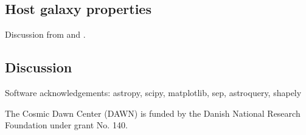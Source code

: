 \documentclass[twocolumn]{aastex63}
\begin{document}
\subsection{Host galaxy properties}
\label{ss:host}

Discussion from \cite{Newman2018a} and \cite{Newman2018b}.

\subsection{Discussion}
\label{s:discussion}

\acknowledgments

{}


Software acknowledgements: astropy, scipy, matplotlib, sep, astroquery, shapely

The Cosmic Dawn Center (DAWN) is funded by the Danish National Research Foundation under grant No. 140. 
\end{document}
